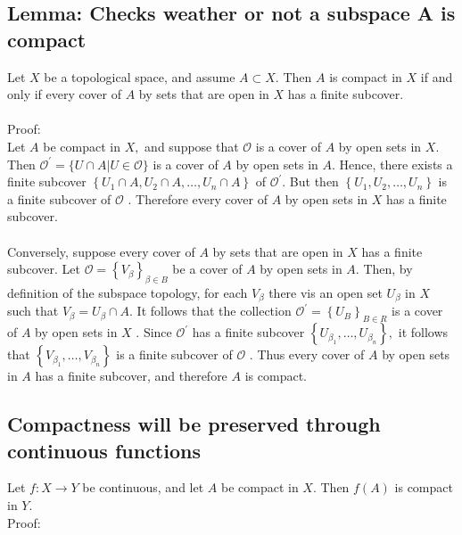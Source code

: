 \documentclass[12pt]{article}
\begin{document}
	\subsection{Lemma: Checks weather or not a subspace A is compact}
			Let $X$ be a topological space, and assume $A \subset X .$ Then $ A $ is compact in $ X $ if and only if every cover of $A$ by sets that are open in $X$ has a finite subcover.\\
			\\
			Proof:\\
			Let $A$ be compact in $X ,$ and suppose that $\mathcal { O }$ is a cover of $A$ by
			open sets in $X .$ Then $\mathcal { O } ^ { \prime } = \{ U \cap A | U \in \mathcal { O } \}$ is a cover of $A$ by open sets in $A .$ Hence, there exists a finite subcover $\left\{ U _ { 1 } \cap A , U _ { 2 } \cap A , \ldots , U _ { n } \cap A \right\}$
			of $\mathcal { O } ^ { \prime } .$ But then $\left\{ U _ { 1 } , U _ { 2 } , \ldots , U _ { n } \right\}$ is a finite subcover of $\mathcal { O }$ . Therefore
			every cover of $A$ by open sets in $X$ has a finite subcover.\\
			\\
			Conversely, suppose every cover of $A$ by sets that are open in $X$
			has a finite subcover. Let $\mathcal { O } = \left\{ V _ { \beta } \right\} _ { \beta \in B }$ be a cover of $A$ by open sets
			in $A .$ Then, by definition of the subspace topology, for each $V _ { \beta }$ there vis an open set $U _ { \beta }$ in $X$ such that $V _ { \beta } = U _ { \beta } \cap A .$ It follows that the
			collection $\mathcal { O } ^ { \prime } = \left\{ U _ { B } \right\} _ { B \in R }$ is a cover of $A$ by open sets in $X$ . Since $\mathcal { O } ^ { \prime }$ has a finite subcover $\left\{ U _ { \beta _ { 1 } } , \ldots , U _ { \beta _ { n } } \right\} ,$ it follows that $\left\{ V _ { \beta _ { 1 } } , \ldots , V _ { \beta _ { n } } \right\}$ is a
			finite subcover of $\mathcal { O }$ . Thus every cover of $A$ by open sets in $A$ has a finite subcover, and therefore $ A $ is compact.\\
	\subsection{Compactness will be preserved through continuous functions}
		Let $f : X \rightarrow Y$ be continuous, and let $A$ be compact in $X .$ Then $ f(A) $ is compact in $ Y $.\\
		Proof:\\
		
\end{document}
